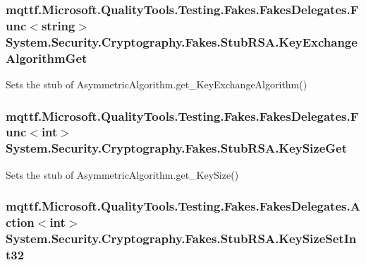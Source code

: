\hypertarget{class_system_1_1_security_1_1_cryptography_1_1_fakes_1_1_stub_r_s_a_ad269639553a12d757867aa8ce9796fca}{
\subsubsection[{Key\-Exchange\-Algorithm\-Get}]{\setlength{\rightskip}{0pt plus 5cm}mqttf.\-Microsoft.\-Quality\-Tools.\-Testing.\-Fakes.\-Fakes\-Delegates.\-Func$<$string$>$ System.\-Security.\-Cryptography.\-Fakes.\-Stub\-R\-S\-A.\-Key\-Exchange\-Algorithm\-Get}}\label{class_system_1_1_security_1_1_cryptography_1_1_fakes_1_1_stub_r_s_a_ad269639553a12d757867aa8ce9796fca}


Sets the stub of Asymmetric\-Algorithm.\-get\-\_\-\-Key\-Exchange\-Algorithm()

\hypertarget{class_system_1_1_security_1_1_cryptography_1_1_fakes_1_1_stub_r_s_a_a5051cde4ee431051b8ab862ec93274b8}{
\subsubsection[{Key\-Size\-Get}]{\setlength{\rightskip}{0pt plus 5cm}mqttf.\-Microsoft.\-Quality\-Tools.\-Testing.\-Fakes.\-Fakes\-Delegates.\-Func$<$int$>$ System.\-Security.\-Cryptography.\-Fakes.\-Stub\-R\-S\-A.\-Key\-Size\-Get}}\label{class_system_1_1_security_1_1_cryptography_1_1_fakes_1_1_stub_r_s_a_a5051cde4ee431051b8ab862ec93274b8}


Sets the stub of Asymmetric\-Algorithm.\-get\-\_\-\-Key\-Size()

\hypertarget{class_system_1_1_security_1_1_cryptography_1_1_fakes_1_1_stub_r_s_a_a5f3988906779cd79a04d92ab01ba64ff}{
\subsubsection[{Key\-Size\-Set\-Int32}]{\setlength{\rightskip}{0pt plus 5cm}mqttf.\-Microsoft.\-Quality\-Tools.\-Testing.\-Fakes.\-Fakes\-Delegates.\-Action$<$int$>$ System.\-Security.\-Cryptography.\-Fakes.\-Stub\-R\-S\-A.\-Key\-Size\-Set\-Int32}}\label{class_system_1_1_security_1_1_cryptography_1_1_fakes_1_1_stub_r_s_a_a5f3988906779cd79a04d92ab01ba64ff}


